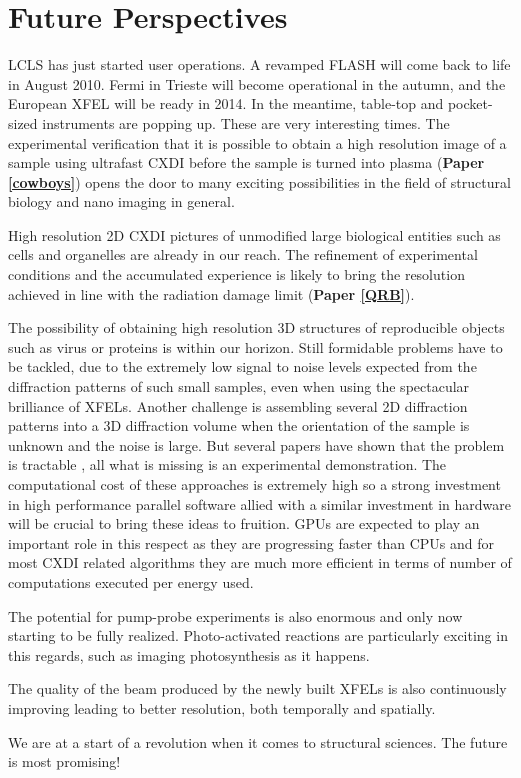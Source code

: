 \chapter{Future Perspectives}\label{Future Perspectives}\noindent

LCLS has just started user operations. A revamped FLASH will come back to life
in August 2010. Fermi in Trieste will become operational in the autumn, and the
European XFEL will be ready in 2014. In the meantime, table-top and pocket-sized
instruments are popping up. These are very interesting times. The experimental
verification that it is possible to obtain a high resolution image of a sample
using ultrafast CXDI before the sample is turned into plasma ({\bf Paper
  \ref{cowboys}}) opens the door to many exciting possibilities in the field of
structural biology and nano imaging in general.

High resolution 2D CXDI pictures of unmodified large biological entities such as cells
and organelles are already in our reach. The refinement of experimental
conditions and the accumulated experience is likely to bring the resolution
achieved in line with the radiation damage limit ({\bf Paper
  \ref{QRB}}).

The possibility of obtaining high resolution 3D structures of reproducible
objects such as virus or proteins is within our horizon. Still formidable
problems have to be tackled, due to the extremely low signal to noise levels
expected from the diffraction patterns of such small samples, even when using
the spectacular brilliance of XFELs. Another challenge is assembling
several 2D diffraction patterns into a 3D diffraction volume when the
orientation of the sample is unknown and the noise is large. But several papers
have shown that the problem is tractable
\cite{Elser2009Noise,NeTeDuaneLoh2009Reconstruction,Fung2008Structure}, all 
what is missing is an experimental demonstration. The computational cost of
these approaches is extremely high so a strong investment in high
performance parallel software allied with a similar investment in hardware will
be crucial to bring these ideas to fruition. GPUs are expected to play an
important role in this respect as they are progressing faster than CPUs and for
most CXDI related algorithms they are much more efficient in terms of number of 
computations executed per energy used.

The potential for pump-probe experiments is also enormous and only now starting to be
fully realized. Photo-activated reactions are particularly exciting in this
regards, such as imaging photosynthesis as it happens.

The quality of the beam produced by the newly built XFELs is also continuously
improving leading to better resolution, both temporally and spatially.

We are at a start of a revolution when it comes to structural sciences. 
The future is most promising!





